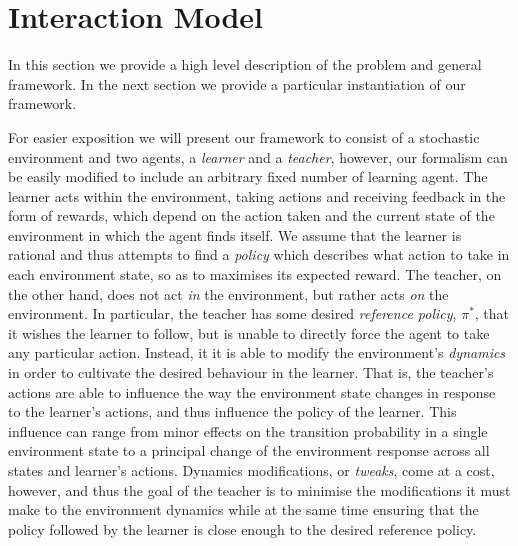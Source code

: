

\section{Interaction Model}\label{sec: GeneralModel}

In this section we provide a high level description of the problem and
general framework.  In the next section we provide a particular
instantiation of our framework.

For easier exposition we will present our framework to consist of a
stochastic environment and two agents, a \emph{learner} and a
\emph{teacher}, however, our formalism can be easily modified to
include an arbitrary fixed number of learning agent. The learner acts
within the environment, taking actions and receiving feedback in the
form of rewards, which depend on the action taken and the current
state of the environment in which the agent finds itself.  We assume
that the learner is rational and thus attempts to find a \emph{policy}
which describes what action to take in each environment state, so as
to maximises its expected reward.  The teacher, on the other hand,
does not act \emph{in} the environment, but rather acts \emph{on} the
environment.  In particular, the teacher has some desired
\emph{reference policy}, $\pi^*$, that it wishes the learner to
follow, but is unable to directly force the agent to take any
particular action.  Instead, it it is able to modify the environment's
\emph{dynamics} in order to cultivate the desired behaviour in the
learner.  That is, the teacher's actions are able to influence the way
the environment state changes in response to the learner's actions,
and thus influence the policy of the learner. This influence can range
from minor effects on the transition probability in a single
environment state to a principal change of the environment response
across all states and learner's actions. Dynamics modifications, or
\emph{tweaks}, come at a cost, however, and thus the goal of the
teacher is to minimise the modifications it must make to the
environment dynamics while at the same time ensuring that the policy
followed by the learner is close enough to the desired reference
policy.

